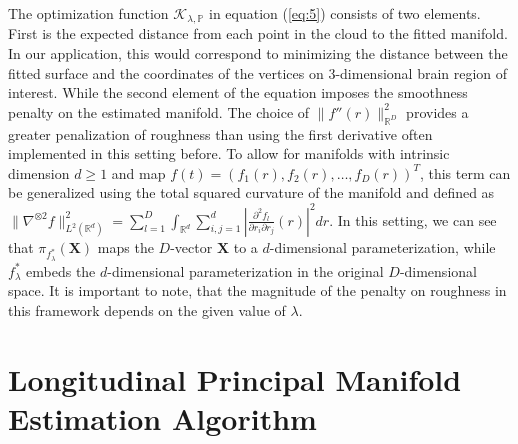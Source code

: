 \documentclass[11pt,reqno]{article}
\theoremstyle{definition}
\begin{document}
The optimization function $\mathcal{K}_{\lambda, \mathbb{P}}$ in equation (\ref{eq:5}) consists of two elements. First is the expected distance from each point in the cloud to the fitted manifold. In our application, this would correspond to minimizing the distance between the fitted surface and the coordinates of the vertices on 3-dimensional brain region of interest. While the second element of the equation imposes the smoothness penalty on the estimated manifold. The choice of $\|f''(r)\|_{\mathbb{R}^{D}}^2$ provides a greater penalization of roughness than using the first derivative often implemented in this setting before. To allow for manifolds with intrinsic dimension $d \geq 1$ and map $f(t) = \left(f_1(r), f_2(r), \dots, f_D(r)\right)^{T}$, this term can be generalized using the total squared curvature of the manifold and defined as $\|\nabla^{\otimes 2}f\|_{L^2(\mathbb{R}^{d})}^2 = \sum_{l=1}^{D} \int_{\mathbb{R}^{d}}\sum_{i, j = 1}^{d}\left|\frac{\partial^2f_l}{\partial r_i \partial r_j}(r)\right|^2dr$. In this setting, we can see that $\pi_{f_{\lambda}^{*}}(\boldsymbol{X})$ maps the $D$-vector $\boldsymbol{X}$ to a $d$-dimensional parameterization, while $f_{\lambda}^{*}$ embeds the $d$-dimensional parameterization in the original $D$-dimensional space. It is important to note, that the  magnitude of the penalty on roughness in this framework depends on the given value of $\lambda$.








\section{Longitudinal Principal Manifold Estimation Algorithm}\label{s:LPME}
\end{document}

